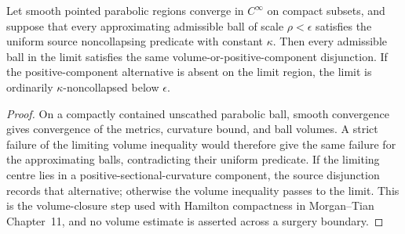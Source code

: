 \begin{lemma}
\label{lem:noncollapsing-predicate-pointed-limit}
Let smooth pointed parabolic regions converge in $C^\infty$ on compact
subsets, and suppose that every approximating admissible ball of scale
$\rho<\epsilon$ satisfies the uniform source noncollapsing predicate with
constant $\kappa$.  Then every admissible ball in the limit satisfies the
same volume-or-positive-component disjunction.  If the positive-component
alternative is absent on the limit region, the limit is ordinarily
$\kappa$-noncollapsed below $\epsilon$.
\end{lemma}

\begin{proof}
On a compactly contained unscathed parabolic ball, smooth convergence gives
convergence of the metrics, curvature bound, and ball volumes.  A strict
failure of the limiting volume inequality would therefore give the same
failure for the approximating balls, contradicting their uniform predicate.
If the limiting centre lies in a positive-sectional-curvature component, the
source disjunction records that alternative; otherwise the volume inequality
passes to the limit.  This is the volume-closure step used with Hamilton
compactness in Morgan--Tian Chapter~11, and no volume estimate is asserted
across a surgery boundary.
\end{proof}

